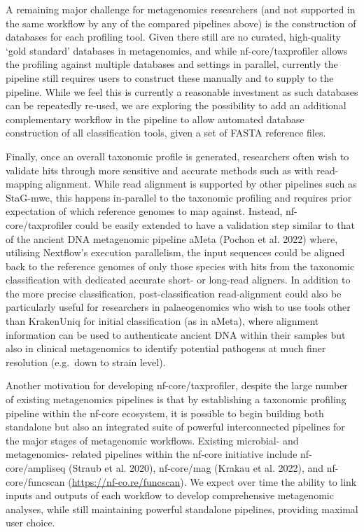 \documentclass[
]{article}
\begin{document}
A remaining major challenge for metagenomics researchers (and not
supported in the same workflow by any of the compared pipelines above)
is the construction of databases for each profiling tool. Given there
still are no curated, high-quality `gold standard' databases in
metagenomics, and while nf-core/taxprofiler allows the profiling against
multiple databases and settings in parallel, currently the pipeline
still requires users to construct these manually and to supply to the
pipeline. While we feel this is currently a reasonable investment as
such databases can be repeatedly re-used, we are exploring the
possibility to add an additional complementary workflow in the pipeline
to allow automated database construction of all classification tools,
given a set of FASTA reference files.

Finally, once an overall taxonomic profile is generated, researchers
often wish to validate hits through more sensitive and accurate methods
such as with read-mapping alignment. While read alignment is supported
by other pipelines such as StaG-mwc, this happens in-parallel to the
taxonomic profiling and requires prior expectation of which reference
genomes to map against. Instead, nf-core/taxprofiler could be easily
extended to have a validation step similar to that of the ancient DNA
metagenomic pipeline aMeta (Pochon et al. 2022) where, utilising
Nextflow's execution parallelism, the input sequences could be aligned
back to the reference genomes of only those species with hits from the
taxonomic classification with dedicated accurate short- or long-read
aligners. In addition to the more precise classification,
post-classification read-alignment could also be particularly useful for
researchers in palaeogenomics who wish to use tools other than
KrakenUniq for initial classification (as in aMeta), where alignment
information can be used to authenticate ancient DNA within their samples
but also in clinical metagenomics to identify potential pathogens at
much finer resolution (e.g.~down to strain level).

Another motivation for developing nf-core/taxprofiler, despite the large
number of existing metagenomics pipelines is that by establishing a
taxonomic profiling pipeline within the nf-core ecosystem, it is
possible to begin building both standalone but also an integrated suite
of powerful interconnected pipelines for the major stages of metagenomic
workflows. Existing microbial- and metagenomics- related pipelines
within the nf-core initiative include nf-core/ampliseq (Straub et al.
2020), nf-core/mag (Krakau et al. 2022), and nf-core/funcscan
(\url{https://nf-co.re/funcscan}). We expect over time the ability to
link inputs and outputs of each workflow to develop comprehensive
metagenomic analyses, while still maintaining powerful standalone
pipelines, providing maximal user choice.
\end{document}
